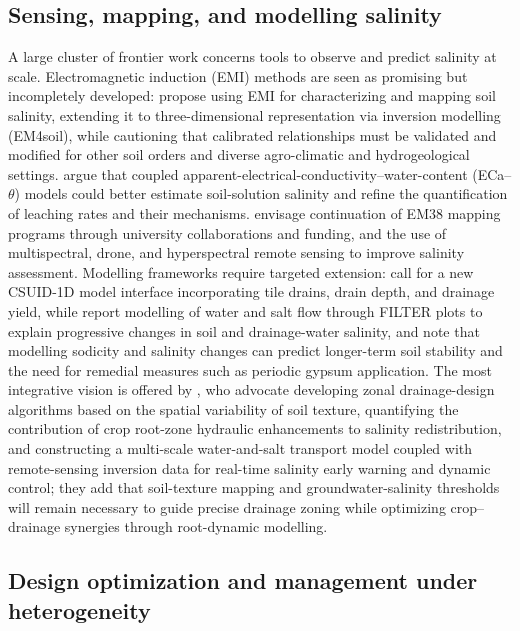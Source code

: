 \subsection{Sensing, mapping, and modelling salinity}

A large cluster of frontier work concerns tools to observe and predict salinity at scale. Electromagnetic induction (EMI) methods are seen as promising but incompletely developed: \textcite{Narjary2024} propose using EMI for characterizing and mapping soil salinity, extending it to three-dimensional representation via inversion modelling (EM4soil), while cautioning that calibrated relationships must be validated and modified for other soil orders and diverse agro-climatic and hydrogeological settings. \textcite{Yu2025} argue that coupled apparent-electrical-conductivity--water-content (ECa--$\theta$) models could better estimate soil-solution salinity and refine the quantification of leaching rates and their mechanisms. \textcite{Singh2020d} envisage continuation of EM38 mapping programs through university collaborations and funding, and the use of multispectral, drone, and hyperspectral remote sensing to improve salinity assessment. Modelling frameworks require targeted extension: \textcite{Singh2020d} call for a new CSUID-1D model interface incorporating tile drains, drain depth, and drainage yield, while \textcite{Jayawardane2001} report modelling of water and salt flow through FILTER plots to explain progressive changes in soil and drainage-water salinity, and note that modelling sodicity and salinity changes can predict longer-term soil stability and the need for remedial measures such as periodic gypsum application. The most integrative vision is offered by \textcite{Zhu2025b}, who advocate developing zonal drainage-design algorithms based on the spatial variability of soil texture, quantifying the contribution of crop root-zone hydraulic enhancements to salinity redistribution, and constructing a multi-scale water-and-salt transport model coupled with remote-sensing inversion data for real-time salinity early warning and dynamic control; they add that soil-texture mapping and groundwater-salinity thresholds will remain necessary to guide precise drainage zoning while optimizing crop--drainage synergies through root-dynamic modelling.

\subsection{Design optimization and management under heterogeneity}

